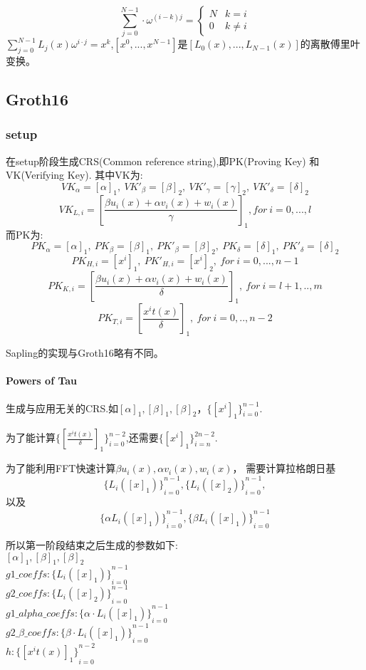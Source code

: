 \documentclass{article}
\begin{document}
\begin{displaymath}
\sum_{j=0}^{N-1} \cdot \omega^{(i-k)j} = \left\{ \begin{array}{ll}
    N & k=i \\
    0 & k \not = i
\end{array} \right.
\end{displaymath}
$\sum_{j=0}^{N-1} L_j(x)\omega^{i\cdot j} = x^k$,$[x^0,...,x^{N-1}]$是$[L_0(x),...,L_{N-1}(x)]$的离散傅里叶变换。


\subsection{Groth16}

\subsubsection{setup}

在setup阶段生成CRS(Common reference string),即PK(Proving Key) 和 VK(Verifying Key).
其中VK为:
$$VK_\alpha = [\alpha]_1,\ VK'_\beta=[\beta]_2,\ VK'_\gamma=[\gamma]_2,\ VK'_\delta=[\delta]_2 $$
$$VK_{L,i} = \left[\frac{\beta u_i(x)+\alpha v_i(x)+w_i(x)}{\gamma}\right]_1, for\ i = 0,...,l$$
而PK为:
$$PK_\alpha=[\alpha]_1,\ PK_\beta=[\beta]_1,\ PK'_\beta=[\beta]_2,\ PK_\delta=[\delta]_1,\ PK'_\delta=[\delta]_2 $$
$$PK_{H,i}=[x^i]_1,\ PK'_{H,i} =[x^i]_2,\ for\ i=0,...,n-1$$
$$PK_{K,i} = \left[\frac{\beta u_i(x)+\alpha v_i(x)+w_i(x)}{\delta}\right]_1,\ for\ i=l+1,..,m$$
$$PK_{T,i} = \left[\frac{x^it(x)}{\delta}\right]_1,\ for\ i=0,..,n-2$$

Sapling的实现与Groth16略有不同。
\paragraph{Powers of Tau\\}

生成与应用无关的CRS.如$[\alpha]_1, [\beta]_1, [\beta]_2，\{[x^i]_1\}_{i=0}^{n-1}$.

为了能计算$\{[\frac{x^it(x)}{\delta}]_1\}_{i=0}^{n-2}$,还需要$\{[x^i]_1\}_{i=n}^{2n-2}$.

为了能利用FFT快速计算$\beta u_i(x),\alpha v_i(x), w_i(x)$，
需要计算拉格朗日基
$${\{L_i([x]_1)\}}_{i=0}^{n-1},{\{L_i([x]_2)\}}_{i=0}^{n-1},$$
以及 
$${\{\alpha L_i([x]_1)\}}_{i=0}^{n-1},{\{\beta L_i([x]_1)\}}_{i=0}^{n-1}$$

所以第一阶段结束之后生成的参数如下:\\
$[\alpha]_1, [\beta]_1, [\beta]_2$\\
$g1\_coeffs: {\{L_i([x]_1)\}}_{i=0}^{n-1}$\\
$g2\_coeffs: {\{L_i([x]_2)\}}_{i=0}^{n-1}$\\
$g1\_alpha\_coeffs: {\{\alpha\cdot L_i([x]_1)\}}_{i=0}^{n-1}$\\
$g2\_\beta\_coeffs: {\{\beta\cdot L_i([x]_1)\}}_{i=0}^{n-1}$\\
$h: {\{[x^it(x)]_1\}}_{i=0}^{n-2}$
\end{document}
